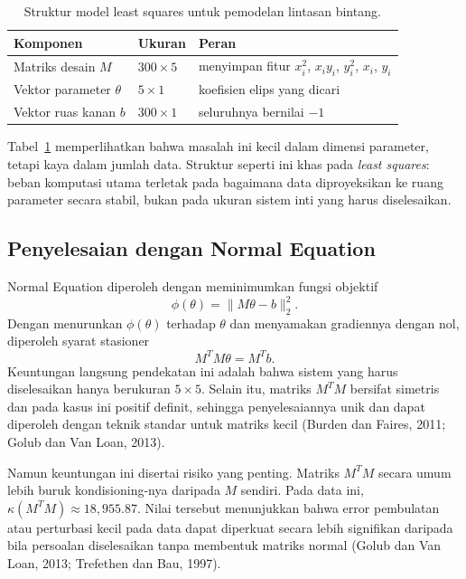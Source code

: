 \documentclass[12pt,a4paper]{article}
\begin{document}
\begin{table}[h]
\centering
\caption{Struktur model least squares untuk pemodelan lintasan bintang.}
\label{tab:star-model}
\begin{tabular}{lll}
\toprule
Komponen & Ukuran & Peran \\
\midrule
Matriks desain $M$ & $300 \times 5$ & menyimpan fitur $x_i^2$, $x_i y_i$, $y_i^2$, $x_i$, $y_i$ \\
Vektor parameter $\theta$ & $5 \times 1$ & koefisien elips yang dicari \\
Vektor ruas kanan $b$ & $300 \times 1$ & seluruhnya bernilai $-1$ \\
\bottomrule
\end{tabular}
\end{table}

Tabel~\ref{tab:star-model} memperlihatkan bahwa masalah ini kecil dalam dimensi parameter, tetapi kaya dalam jumlah data. Struktur seperti ini khas pada \emph{least squares}: beban komputasi utama terletak pada bagaimana data diproyeksikan ke ruang parameter secara stabil, bukan pada ukuran sistem inti yang harus diselesaikan.

\subsection{Penyelesaian dengan Normal Equation}
Normal Equation diperoleh dengan meminimumkan fungsi objektif
\[
\phi(\theta)=\|M\theta-b\|_2^2.
\]
Dengan menurunkan \(\phi(\theta)\) terhadap \(\theta\) dan menyamakan gradiennya dengan nol, diperoleh syarat stasioner
\[
M^TM\theta = M^Tb.
\]
Keuntungan langsung pendekatan ini adalah bahwa sistem yang harus diselesaikan hanya berukuran \(5\times 5\). Selain itu, matriks \(M^TM\) bersifat simetris dan pada kasus ini positif definit, sehingga penyelesaiannya unik dan dapat diperoleh dengan teknik standar untuk matriks kecil (Burden dan Faires, 2011; Golub dan Van Loan, 2013).

Namun keuntungan ini disertai risiko yang penting. Matriks \(M^TM\) secara umum lebih buruk kondisioning-nya daripada \(M\) sendiri. Pada data ini, \(\kappa(M^TM)\approx 18{,}955.87\). Nilai tersebut menunjukkan bahwa error pembulatan atau perturbasi kecil pada data dapat diperkuat secara lebih signifikan daripada bila persoalan diselesaikan tanpa membentuk matriks normal (Golub dan Van Loan, 2013; Trefethen dan Bau, 1997).
\end{document}
